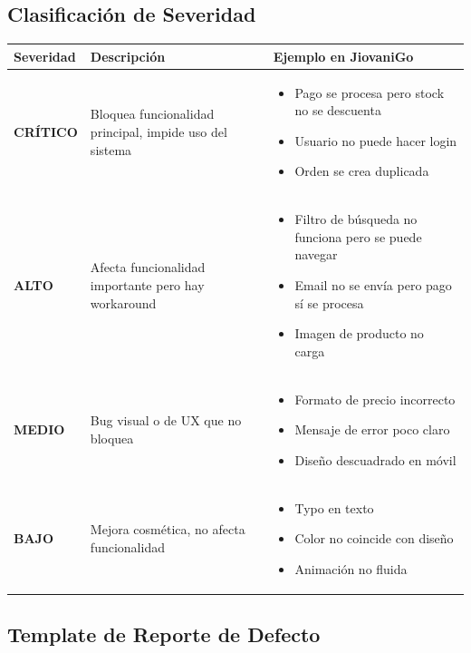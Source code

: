 \documentclass[12pt,a4paper]{article}
\begin{document}
\subsection{Clasificación de Severidad}

\begin{longtable}{|p{3cm}|p{5cm}|p{6cm}|}
\hline
\textbf{Severidad} & \textbf{Descripción} & \textbf{Ejemplo en JiovaniGo} \\
\hline
\endfirsthead
\textbf{CRÍTICO} & Bloquea funcionalidad principal, impide uso del sistema &
\begin{itemize}[leftmargin=*,nosep]
    \item Pago se procesa pero stock no se descuenta
    \item Usuario no puede hacer login
    \item Orden se crea duplicada
\end{itemize} \\
\hline
\textbf{ALTO} & Afecta funcionalidad importante pero hay workaround &
\begin{itemize}[leftmargin=*,nosep]
    \item Filtro de búsqueda no funciona pero se puede navegar
    \item Email no se envía pero pago sí se procesa
    \item Imagen de producto no carga
\end{itemize} \\
\hline
\textbf{MEDIO} & Bug visual o de UX que no bloquea &
\begin{itemize}[leftmargin=*,nosep]
    \item Formato de precio incorrecto
    \item Mensaje de error poco claro
    \item Diseño descuadrado en móvil
\end{itemize} \\
\hline
\textbf{BAJO} & Mejora cosmética, no afecta funcionalidad &
\begin{itemize}[leftmargin=*,nosep]
    \item Typo en texto
    \item Color no coincide con diseño
    \item Animación no fluida
\end{itemize} \\
\hline
\end{longtable}

\subsection{Template de Reporte de Defecto}
\end{document}

